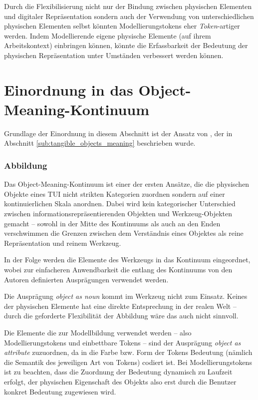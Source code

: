 Durch die Flexibilisierung nicht nur der Bindung zwischen physischen Elementen und digitaler Repräsentation sondern auch der Verwendung von unterschiedlichen physischen Elementen selbst könnten Modellierungstokens eher \emph{Token}-artiger werden. Indem Modellierende eigene physische Elemente (auf ihrem Arbeitskontext) einbringen können, könnte die Erfassbarkeit der Bedeutung der physischen Repräsentation unter Umständen verbessert werden können.


\section{Einordnung in das Object-Meaning-Kontinuum} %
\label{sec:einordnung_in_das_object_meaning_kontinuum}

Grundlage der Einordnung in diesem Abschnitt ist der Ansatz von \citet{Underkoffler99}, der in Abschnitt \ref{sub:tangible_objects_meaning} beschrieben wurde.

\subsubsection{Abbildung} 

Das Object-Meaning-Kontinuum ist einer der ersten Ansätze, die die physischen Objekte eines \gls{TUI} nicht strikten Kategorien zuordnen sondern auf einer kontinuierlichen Skala anordnen. Dabei wird kein kategorischer Unterschied zwischen informationsrepräsentierenden Objekten und Werkzeug-Objekten gemacht -- sowohl in der Mitte des Kontinuums als auch an den Enden verschwimmen die Grenzen zwischen dem Verständnis eines Objektes als reine Repräsentation und reinem Werkzeug. 

In der Folge werden die Elemente des Werkzeugs in das Kontinuum eingeordnet, wobei zur einfacheren Anwendbarkeit die entlang des Kontinuums von den Autoren definierten Ausprägungen verwendet werden.

Die Ausprägung \emph{object as noun} kommt im Werkzeug nicht zum Einsatz. Keines der physischen Elemente hat eine direkte Entsprechung in der realen Welt -- durch die geforderte Flexibilität der Abbildung wäre das auch nicht sinnvoll. 

Die Elemente die zur Modellbildung verwendet werden -- also Modellierungstokens und einbettbare Tokens -- sind der Ausprägung \emph{object as attribute} zuzuordnen, da in die Farbe bzw. Form der Tokens Bedeutung (nämlich die Semantik des jeweiligen Art von Tokens) codiert ist. Bei Modellierungstokens ist zu beachten, dass die Zuordnung der Bedeutung dynamisch zu Laufzeit erfolgt, der physischen Eigenschaft des Objekts also erst durch die Benutzer konkret Bedeutung zugewiesen wird.

